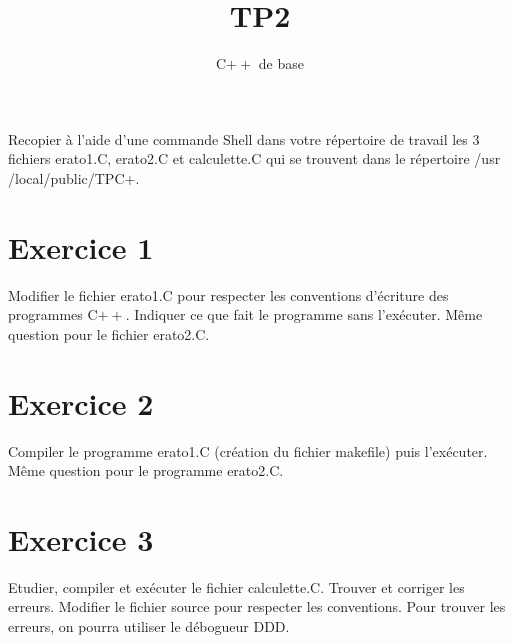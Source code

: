 \documentclass{article}
\title{TP2}
\date{C$++$ de base}
\begin{document}
	\maketitle 
	Recopier à l'aide d'une commande Shell dans votre répertoire de travail les 3 fichiers erato1.C, erato2.C et calculette.C qui se trouvent dans le répertoire 
	/usr /local/public/TPC+.
	\section*{Exercice 1}
		Modifier le fichier erato1.C pour respecter les conventions d'écriture des programmes C$++$. Indiquer ce que fait le programme sans l'exécuter. Même question pour le fichier erato2.C.
	\section*{Exercice 2}
		Compiler le programme erato1.C (création du fichier makefile) puis l'exécuter. Même question pour le programme erato2.C.
	\section*{Exercice 3}
		Etudier, compiler et exécuter le fichier calculette.C. Trouver et corriger les erreurs. Modifier le fichier source pour respecter les conventions. Pour trouver les erreurs, on pourra utiliser le débogueur DDD.
	
\end{document}
